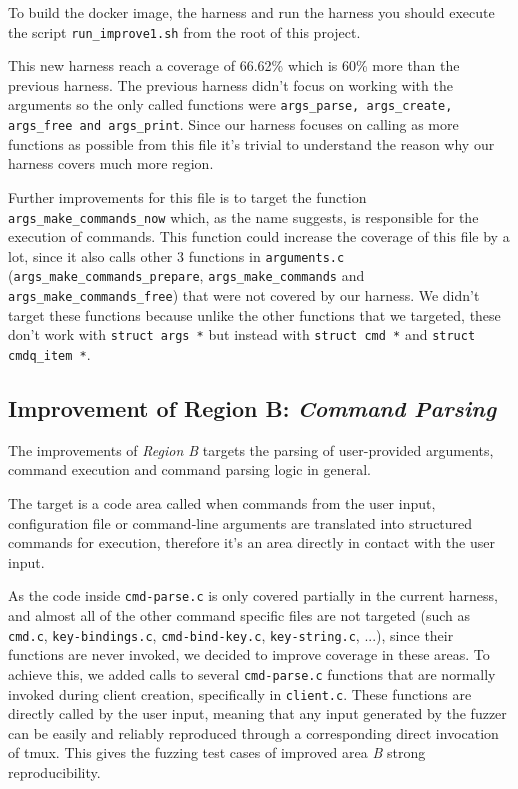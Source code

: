 To build the docker image, the harness and run the harness you should execute the script \texttt{run\_improve1.sh} from the root of this project.

This new harness reach a coverage of 66.62\% which is 60\% more than the previous harness. The previous harness didn't focus on working with the arguments so the only called functions were \texttt{args\_parse, args\_create, args\_free and args\_print}. Since our harness focuses on calling as more functions as possible from this file it's trivial to understand the reason why our harness covers much more region.

Further improvements for this file is to target the function \texttt{args\_make\_commands\_now} which, as the name suggests, is responsible for the execution of commands. This function could increase the coverage of this file by a lot, since it also calls other 3 functions in \texttt{arguments.c} (\texttt{args\_make\_commands\_prepare}, \texttt{args\_make\_commands} and \texttt{args\_make\_commands\_free}) that were not covered by our harness. We didn't target these functions because unlike the other functions that we targeted, these don't work with \texttt{struct args *} but instead with \texttt{struct cmd *} and \texttt{struct cmdq\_item *}.


\subsection*{Improvement of Region B: \textit{Command Parsing}}

The improvements of \textit{Region B} targets the parsing of user-provided arguments, command execution and command parsing logic in general.

The target is a code area called when commands from the user input, configuration file  or command-line arguments are translated into structured commands for execution, therefore it's an area directly in contact with the user input.

As the code inside \texttt{cmd-parse.c} is only covered partially in the current harness, and almost all of the other command specific files are not targeted (such as \texttt{cmd.c}, \texttt{key-bindings.c}, \texttt{cmd-bind-key.c}, \texttt{key-string.c}, ...), since their functions are never invoked, we decided to improve coverage in these areas. To achieve this, we added calls to several \texttt{cmd-parse.c} functions that are normally invoked during client creation, specifically in \texttt{client.c}. These functions are directly called by the user input, meaning that any input generated by the fuzzer can be  easily and reliably reproduced through a corresponding direct invocation of tmux. This gives the fuzzing test cases of improved area \textit{B} strong reproducibility.

